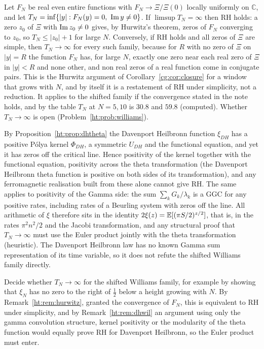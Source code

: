 \begin{remark}\label{ht:rem:hurwitz}
Let $F_N$ be real even entire functions with $F_N\to\Xi/\Xi(0)$ locally uniformly on $\mathbb C$, and let $T_N=\inf\{|y|:F_N(y)=0,\ \operatorname{Im} y\ne0\}$. If $\limsup T_N=\infty$ then RH holds: a zero $z_0$ of $\Xi$ with $\operatorname{Im} z_0\ne0$ gives, by Hurwitz's theorem, zeros of $F_N$ converging to $z_0$, so $T_N\le|z_0|+1$ for large $N$. Conversely, if RH holds and all zeros of $\Xi$ are simple, then $T_N\to\infty$ for every such family, because for $R$ with no zero of $\Xi$ on $|y|=R$ the function $F_N$ has, for large $N$, exactly one zero near each real zero of $\Xi$ in $|y|<R$ and none other, and non real zeros of a real function come in conjugate pairs. This is the Hurwitz argument of Corollary~\ref{cg:cor:closure} for a window that grows with $N$, and by itself it is a restatement of RH under simplicity, not a reduction. It applies to the shifted family if the convergence stated in the note holds, and by the table $T_N$ at $N=5,10$ is $30.8$ and $59.8$ (computed). Whether $T_N\to\infty$ is open (Problem~\ref{ht:prob:williams}).
\end{remark}

\begin{remark}\label{ht:rem:dhwil}
By Proposition~\ref{ht:prop:dhtheta} the Davenport Heilbronn function $\xi_{DH}$ has a positive P\'olya kernel $\Phi_{DH}$, a symmetric $U_{DH}$ and the functional equation, and yet it has zeros off the critical line. Hence positivity of the kernel together with the functional equation, positivity across the theta transformation (the Davenport Heilbronn theta function is positive on both sides of its transformation), and any ferromagnetic realisation built from these alone cannot give RH. The same applies to positivity of the Gamma side: the sum $\sum_kG_k/\lambda_k$ is a GGC for any positive rates, including rates of a Beurling system with zeros off the line. All arithmetic of $\xi$ therefore sits in the identity $2\xi(z)=\mathbb{E}[(\pi S/2)^{z/2}]$, that is, in the rates $\pi^2n^2/2$ and the Jacobi transformation, and any structural proof that $T_N\to\infty$ must use the Euler product jointly with the theta transformation (heuristic). The Davenport Heilbronn law has no known Gamma sum representation of its time variable, so it does not refute the shifted Williams family directly.
\end{remark}

\begin{problem}\label{ht:prob:williams}
Decide whether $T_N\to\infty$ for the shifted Williams family, for example by showing that $\xi_N$ has no zero to the right of $\frac12$ below a height growing with $N$. By Remark~\ref{ht:rem:hurwitz}, granted the convergence of $F_N$, this is equivalent to RH under simplicity, and by Remark~\ref{ht:rem:dhwil} an argument using only the gamma convolution structure, kernel positivity or the modularity of the theta function would equally prove RH for Davenport Heilbronn, so the Euler product must enter.
\end{problem}

